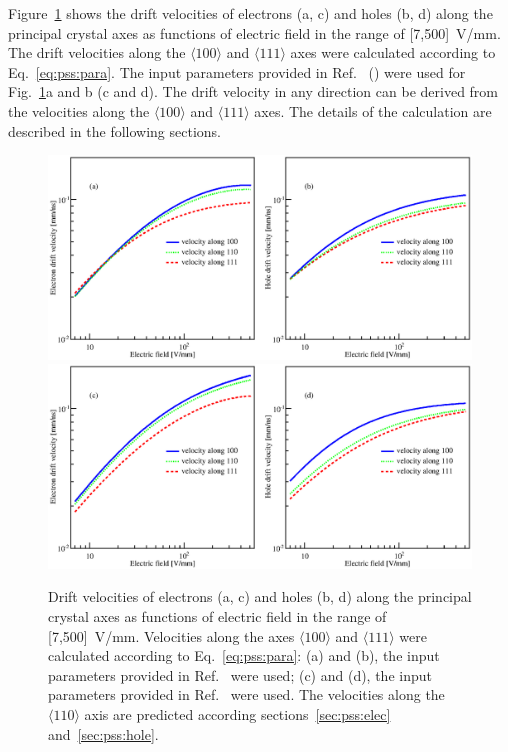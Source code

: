 Figure~\ref{fig:pss:vvse} shows the drift velocities of electrons (a,
c) and holes (b, d) along the principal crystal axes as functions of
electric field in the range of [7,500]~V/mm. The drift velocities
along the $\langle 100 \rangle$ and $\langle 111 \rangle$ axes were
calculated according to Eq.~\ref{eq:pss:para}. The input parameters
provided in Ref.~\cite{miha} (\cite{bart}) were used for
Fig.~\ref{fig:pss:vvse}a and b (c and d).  The drift velocity in any
direction can be derived from the velocities along the $\langle 100
\rangle$ and $\langle 111 \rangle$ axes.  The details of the
calculation are described in the following sections.
 
\begin{figure}[tbhp] 
\centering 
\includegraphics[width=\textwidth]{VvsElucian} \\\hfil 
\includegraphics[width=\textwidth]{VvsEbart} 
\caption{Drift velocities of electrons (a, c) and holes (b, d) along
the principal crystal axes as functions of electric field in the range
of [7,500]~V/mm. Velocities along the axes $\langle 100 \rangle$ and
$\langle 111 \rangle$ were calculated according to
Eq.~\ref{eq:pss:para}: (a) and (b), the input parameters provided in
Ref.~\cite{miha} were used; (c) and (d), the input parameters provided
in Ref.~\cite{bart} were used. The velocities along the $\langle 110
\rangle$ axis are predicted according sections~\ref{sec:pss:elec}
and~\ref{sec:pss:hole}.}
\label{fig:pss:vvse} 
\end{figure} 
 
